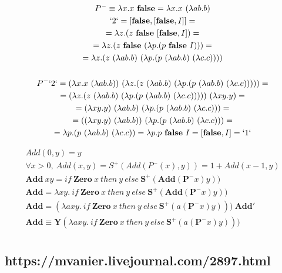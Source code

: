 \documentclass[11pt]{article}
\begin{document}
\begin{gather*}
P^- \equiv \lambda x.x\ \mathbf{false} = \lambda x.x\ (\lambda ab.b) \\
`2` = [\mathbf{false}, [\mathbf{false}, I]] = \\
= \lambda z.(z\ \mathbf{false}\ [\mathbf{false}, I]) = \\
= \lambda z.(z\ \mathbf{false}\ (\lambda p.(p\ \mathbf{false}\ I))) = \\
= \lambda z.(z\ (\lambda ab.b)\ (\lambda p.(p\ (\lambda ab.b)\ (\lambda c.c)))) \\ 
\\
P^- `2`  = (\lambda x.x\ (\lambda ab.b))\ (\lambda z.(z\ (\lambda ab.b)\ (\lambda p.(p\ (\lambda ab.b)\ (\lambda c.c))))) = \\
= (\lambda z.(z\ (\lambda ab.b)\ (\lambda p.(p\ (\lambda ab.b)\ (\lambda c.c)))))\ (\lambda xy.y) = \\
= (\lambda xy.y)\ (\lambda ab.b)\ (\lambda p.(p\ (\lambda ab.b)\ (\lambda c.c))) = \\
= ((\lambda xy.y)\ (\lambda ab.b))\ (\lambda p.(p\ (\lambda ab.b)\ (\lambda c.c))) = \\
= \lambda p.(p\ (\lambda ab.b)\ (\lambda c.c)) = \lambda p. p\ \mathbf{false}\ I = [\mathbf{false}, I] = `1`
\end{gather*}


\begin{gather*}
Add (0, y) = y \\
\forall x > 0,\ Add(x, y) = S^+ (Add (P^- (x), y)) = 1+ Add (x-1, y)\\
\mathbf{Add}\ xy = if\ \mathbf{Zero}\ x\ then\ y\ else\ \mathbf{S^+}(\mathbf{Add} (\mathbf{P^-}x)y)) \\
\mathbf{Add} = \lambda xy.\ if\ \mathbf{Zero}\ x\ then\ y\ else\ \mathbf{S^+}(\mathbf{Add} (\mathbf{P^-}x)y)) \\
\mathbf{Add} = (\lambda axy.\ if\ \mathbf{Zero}\ x\ then\ y\ else\ \mathbf{S^+}(a (\mathbf{P^-}x)y)))\ \mathbf{Add'} \\
\mathbf{Add} \equiv \mathbf{Y} (\lambda axy.\ if\ \mathbf{Zero}\ x\ then\ y\ else\ \mathbf{S^+}(a (\mathbf{P^-}x)y))) \\
\end{gather*}

\clearpage
\subsection*{https://mvanier.livejournal.com/2897.html}
\end{document}
